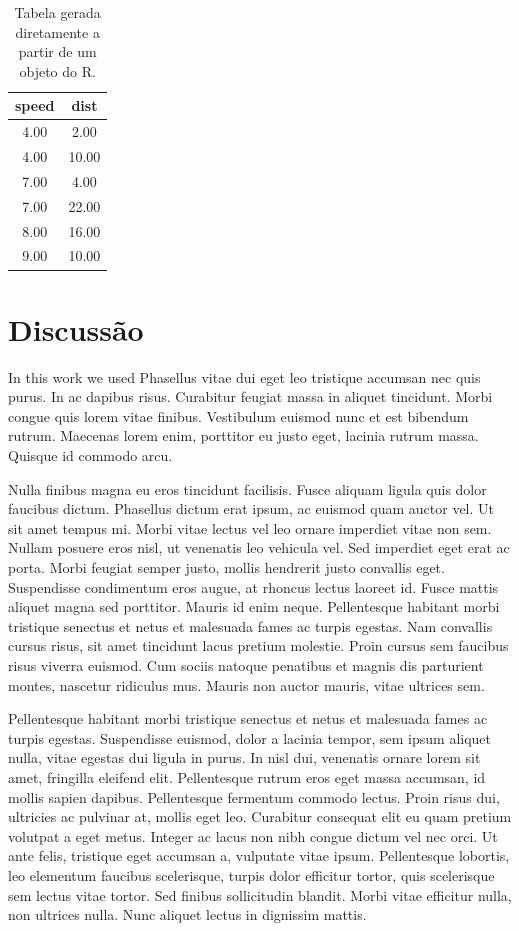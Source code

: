 \documentclass[book,A4paper,10pt,twoside,oldfontcommands]{memoir}\usepackage[]{graphicx}\usepackage[usenames,dvipsnames]{color}
\begin{document}
\begin{btUnit}
\begin{table}[!htb]
\centering
\caption{Tabela gerada diretamente a partir de um objeto do R.} 
\label{tab:res2}
\begin{tabular}{cc}
  \hline
speed & dist \\ 
  \hline
4.00 & 2.00 \\ 
  4.00 & 10.00 \\ 
  7.00 & 4.00 \\ 
  7.00 & 22.00 \\ 
  8.00 & 16.00 \\ 
  9.00 & 10.00 \\ 
   \hline
\end{tabular}
\end{table}


\section{Discussão}

In this work we used Phasellus vitae dui eget leo tristique accumsan
nec quis purus. In ac dapibus risus. Curabitur feugiat massa in
aliquet tincidunt. Morbi congue quis lorem vitae finibus. Vestibulum
euismod nunc et est bibendum rutrum. Maecenas lorem enim, porttitor eu
justo eget, lacinia rutrum massa. Quisque id commodo arcu.

Nulla finibus magna eu eros tincidunt facilisis. Fusce aliquam ligula
quis dolor faucibus dictum. Phasellus dictum erat ipsum, ac euismod
quam auctor vel. Ut sit amet tempus mi. Morbi vitae lectus vel leo
ornare imperdiet vitae non sem. Nullam posuere eros nisl, ut venenatis
leo vehicula vel. Sed imperdiet eget erat ac porta. Morbi feugiat
semper justo, mollis hendrerit justo convallis eget. Suspendisse
condimentum eros augue, at rhoncus lectus laoreet id. Fusce mattis
aliquet magna sed porttitor. Mauris id enim neque. Pellentesque
habitant morbi tristique senectus et netus et malesuada fames ac
turpis egestas. Nam convallis cursus risus, sit amet tincidunt lacus
pretium molestie. Proin cursus sem faucibus risus viverra euismod. Cum
sociis natoque penatibus et magnis dis parturient montes, nascetur
ridiculus mus. Mauris non auctor mauris, vitae ultrices sem.

Pellentesque habitant morbi tristique senectus et netus et malesuada
fames ac turpis egestas. Suspendisse euismod, dolor a lacinia tempor,
sem ipsum aliquet nulla, vitae egestas dui ligula in purus. In nisl
dui, venenatis ornare lorem sit amet, fringilla eleifend elit.
Pellentesque rutrum eros eget massa accumsan, id mollis sapien
dapibus. Pellentesque fermentum commodo lectus. Proin risus dui,
ultricies ac pulvinar at, mollis eget leo. Curabitur consequat elit eu
quam pretium volutpat a eget metus. Integer ac lacus non nibh congue
dictum vel nec orci. Ut ante felis, tristique eget accumsan a,
vulputate vitae ipsum. Pellentesque lobortis, leo elementum faucibus
scelerisque, turpis dolor efficitur tortor, quis scelerisque sem
lectus vitae tortor. Sed finibus sollicitudin blandit. Morbi vitae
efficitur nulla, non ultrices nulla. Nunc aliquet lectus in dignissim
mattis.


\end{btUnit}
\end{document}
